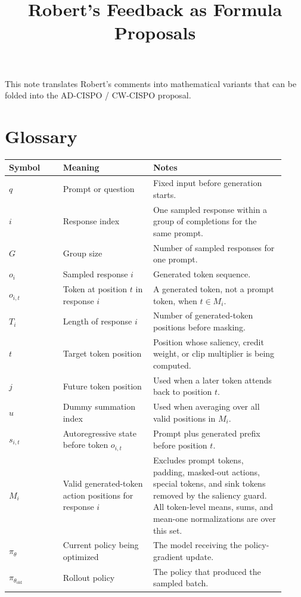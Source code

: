 \documentclass[11pt]{article}
\title{Robert's Feedback as Formula Proposals}
\author{}
\date{}
\begin{document}
\maketitle

This note translates Robert's comments into mathematical variants that can be
folded into the AD-CISPO / CW-CISPO proposal.

\section*{Glossary}

\begin{longtable}{>{\raggedright\arraybackslash}p{0.18\linewidth}p{0.30\linewidth}p{0.44\linewidth}}
\toprule
Symbol & Meaning & Notes \\
\midrule
\endhead
$q$ & Prompt or question & Fixed input before generation starts. \\
$i$ & Response index & One sampled response within a group of completions for the same prompt. \\
$G$ & Group size & Number of sampled responses for one prompt. \\
$o_i$ & Sampled response $i$ & Generated token sequence. \\
$o_{i,t}$ & Token at position $t$ in response $i$ & A generated token, not a prompt token, when $t \in M_i$. \\
$T_i$ & Length of response $i$ & Number of generated-token positions before masking. \\
$t$ & Target token position & Position whose saliency, credit weight, or clip multiplier is being computed. \\
$j$ & Future token position & Used when a later token attends back to position $t$. \\
$u$ & Dummy summation index & Used when averaging over all valid positions in $M_i$. \\
$s_{i,t}$ & Autoregressive state before token $o_{i,t}$ & Prompt plus generated prefix before position $t$. \\
$M_i$ & Valid generated-token action positions for response $i$ & Excludes prompt tokens, padding, masked-out actions, special tokens, and sink tokens removed by the saliency guard. All token-level means, sums, and mean-one normalizations are over this set. \\
$\pi_\theta$ & Current policy being optimized & The model receiving the policy-gradient update. \\
$\pi_{\theta_{\mathrm{old}}}$ & Rollout policy & The policy that produced the sampled batch. \\

\end{longtable}
\end{document}

